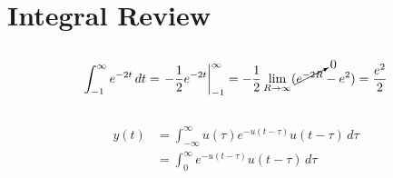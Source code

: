 \documentclass{article}
\begin{document}
\section{Integral Review}

\subsection{}

\begin{equation}
    \int_{-1}^\infty e^{-2t} \, dt = \left.-\frac{1}{2} e^{-2t}\right|_{-1}^\infty = -\frac{1}{2} \lim_{R \to \infty} (\cancelto{0}{e^{-2R}} - e^2) = \frac{e^2}{2}
\end{equation}

\subsection{}

\begin{align}
    y(t) &= \int_{-\infty}^\infty u(\tau) e^{-u(t - \tau)} u(t - \tau) \, d\tau \\
    &= \int_0^\infty e^{-u(t - \tau)} u(t - \tau) \, d\tau
\end{align}
\end{document}
